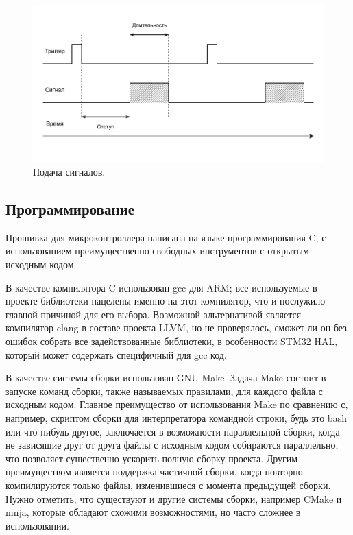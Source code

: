 \documentclass[rusmathsym, eqnumwithinsec, amspack, hyperref]{bomgost}
\begin{document}
%
%
\begin{gostfigure}
\begin{figure}[H]
\centering
\includegraphics{data/timing_diagram.drawio.pdf}
\caption{Подача сигналов.}
\label{fig:timing_diagram}
\end{figure}
\end{gostfigure}

\subsection{Программирование}

Прошивка для микроконтроллера написана на языке программирования C, с использованием преимущественно свободных инструментов с открытым исходным кодом.

В качестве компилятора C использован gcc для ARM; все используемые в проекте библиотеки нацелены именно на этот компилятор, что и послужило главной причиной для его выбора. Возможной альтернативой является компилятор clang в составе проекта LLVM, но не проверялось, сможет ли он без ошибок собрать все задействованные библиотеки, в особенности STM32 HAL, который может содержать специфичный для gcc код.

В качестве системы сборки использован GNU Make. Задача Make состоит в запуске команд сборки, также называемых правилами, для каждого файла с исходным кодом. Главное преимущество от использования Make по сравнению с, например, скриптом сборки для интерпретатора командной строки, будь это bash или что-нибудь другое, заключается в возможности параллельной сборки, когда не зависящие друг от друга файлы с исходным кодом собираются параллельно, что позволяет существенно ускорить полную сборку проекта. Другим преимуществом является поддержка частичной сборки, когда повторно компилируются только файлы, изменившиеся с момента предыдущей сборки. Нужно отметить, что существуют и другие системы сборки, например CMake и ninja, которые обладают схожими возможностями, но часто сложнее в использовании.
\end{document}
